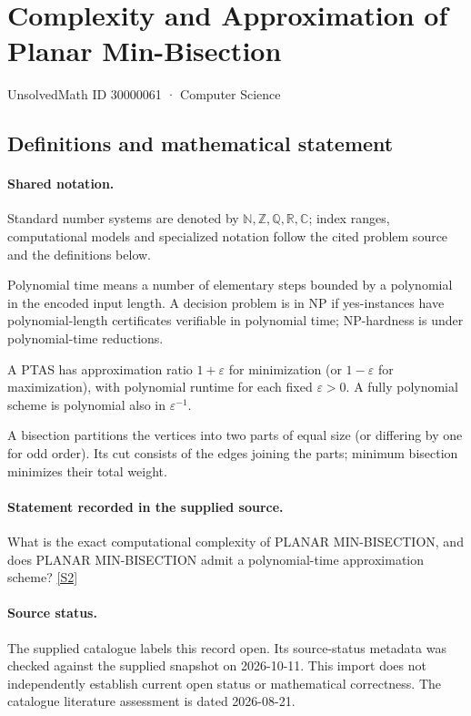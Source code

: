 \documentclass[11pt]{article}
\newcommand{\sref}[2]{\hyperlink{source:#1:#2}{[S#2]}}
\begin{document}
\setcounter{section}{30000060}
\section{Complexity and Approximation of Planar Min-Bisection}\label{30000061}
{\small\sffamily UnsolvedMath ID 30000061 · Computer Science}
\subsection{Definitions and mathematical statement}

\paragraph{Shared notation.}Standard number systems are denoted by $\mathbb N,\mathbb Z,\mathbb Q,\mathbb R,\mathbb C$; index ranges, computational models and specialized notation follow the cited problem source and the definitions below.


Polynomial time means a number of elementary steps bounded by a polynomial in the encoded input length. A decision problem is in $\mathrm{NP}$ if yes-instances have polynomial-length certificates verifiable in polynomial time; NP-hardness is under polynomial-time reductions.

A PTAS has approximation ratio $1+\varepsilon$ for minimization (or $1-\varepsilon$ for maximization), with polynomial runtime for each fixed $\varepsilon>0$. A fully polynomial scheme is polynomial also in $\varepsilon^{-1}$.

A bisection partitions the vertices into two parts of equal size (or differing by one for odd order). Its cut consists of the edges joining the parts; minimum bisection minimizes their total weight.
\paragraph{Statement recorded in the supplied source.}
What is the exact computational complexity of PLANAR MIN-BISECTION, and does PLANAR MIN-BISECTION admit a polynomial-time approximation scheme? \sref{30000061}{2}
\paragraph{Source status.}
The supplied catalogue labels this record open. Its source-status metadata was checked against the supplied snapshot on 2026-10-11. This import does not independently establish current open status or mathematical correctness. The catalogue literature assessment is dated 2026-08-21.
\end{document}

